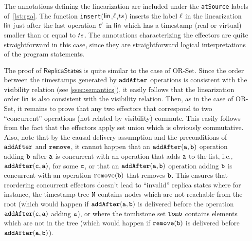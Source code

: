 The annotations defining the linearization are included under the \lstinline|atSource| labels of~\autoref{lst:rga}. The function {\tt insert}($\mathsf{lin}$,$\ell$,$ts$) inserts the label $\ell$ in the linearization $\mathsf{lin}$ just after the last operation $\ell'$ in $\mathsf{lin}$ which has a timestamp (real or virtual) smaller than or equal to $ts$. The annotations characterizing the effectors are quite straightforward in this case, since they are straightforward logical interpretations of the program statements.

The proof of $\mathsf{ReplicaStates}$ is quite similar to the case of OR-Set. Since the order between the timestamps generated by ${\tt addAfter}$ operations is consistent with the visibility relation (see \autoref{ssec:semantics}), it easily follows that the linearization order $\mathsf{lin}$ is also consistent with the visibility relation. Then, as in the case of OR-Set, it remains to prove that any two effectors that correspond to two ``concurrent'' operations (not related by visibility) commute. This easily follows from the fact that the effectors apply set union which is obviously commutative. Also, note that by the causal delivery assumption and the preconditions of ${\tt addAfter}$ and ${\tt remove}$, it cannot happen that an $\alabelshort[{\tt addAfter}]{a,b}$ operation adding ${\tt b}$ after ${\tt a}$ is concurrent with an operation that adds ${\tt a}$ to the list, i.e., $\alabelshort[{\tt addAfter}]{c,a}$, for some ${\tt c}$, or that an $\alabelshort[{\tt addAfter}]{a,b}$ operation adding ${\tt b}$ is concurrent with an operation $\alabelshort[{\tt remove}]{b}$ that removes ${\tt b}$. This ensures that reordering concurrent effectors doesn't lead to ``invalid'' replica states where for instance, the timestamp tree ${\tt N}$ contains nodes which are not reachable from the root (which would happen if $\alabelshort[{\tt addAfter}]{a,b}$ is delivered before the operation $\alabelshort[{\tt addAfter}]{c,a}$ adding ${\tt a}$), or where the tombstone set ${\tt Tomb}$ contains elements which are not in the tree (which would happen if $\alabelshort[{\tt remove}]{b}$ is delivered before $\alabelshort[{\tt addAfter}]{a,b}$).

